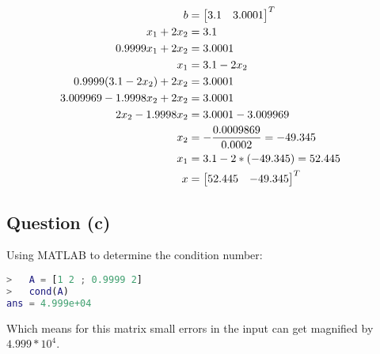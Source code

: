 		\begin{align}
			b &=
			\begin{bmatrix}
				3.1 & 3.0001
			\end{bmatrix}^{T}
			& \\
			x_{1} + 2x_{2} &= 3.1& \notag \\
			0.9999x_{1} + 2x_{2} &= 3.0001& \notag \\
			x_{1} &= 3.1 - 2x_{2}& \notag \\
			0.9999(3.1 - 2x_{2}) + 2x_{2} &= 3.0001& \notag \\
			3.009969 - 1.9998x_{2} + 2x_{2} &= 3.0001& \notag \\
			2x_{2} - 1.9998x_{2} &= 3.0001 - 3.009969& \notag \\
			x_{2} &= -\frac{0.0009869}{0.0002} = -49.345& \\
			x_{1} &= 3.1 - 2*(-49.345) = 52.445& \\
			x &=
			\begin{bmatrix}
				52.445 & -49.345
			\end{bmatrix}^{T}
		\end{align}

	\subsection{Question (c)}

		Using MATLAB to determine the condition number:

		\begin{lstlisting}[language=MATLAB]
>	A = [1 2 ; 0.9999 2]
>	cond(A)
ans = 4.999e+04
		\end{lstlisting}

		Which means for this matrix small errors in the input can get magnified by $4.999*10^{4}$.